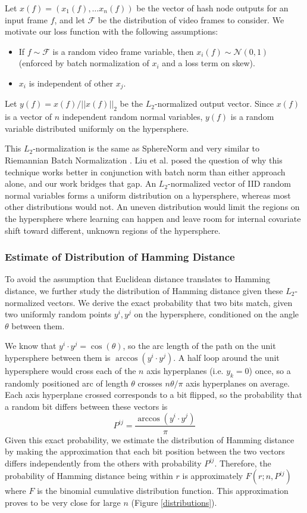 \documentclass{article}
\begin{document}
\begin{multicols}{2}
Let $x(f) = (x_1(f), \ldots x_n(f))$ be the vector of hash node outputs for an input frame $f$, and let $\mathcal{F}$ be the distribution of video frames to consider.
We motivate our loss function with the following assumptions:
\begin{itemize}
\item If $f \sim \mathcal{F}$ is a random video frame variable, then $x_i(f) \sim \mathcal{N}(0,1)$ (enforced by batch normalization of $x_i$ and a loss term on skew).
\item $x_i$ is independent of other $x_j$.
\end{itemize}
Let $y(f) = x(f) / ||x(f)||_2$ be the $L_2$-normalized output vector.
Since $x(f)$ is a vector of $n$ independent random normal variables, $y(f)$ is a random variable distributed uniformly on the hypersphere.

This $L_2$-normalization is the same as SphereNorm \cite{sphere17} and very similar to Riemannian Batch Normalization \cite{riemannian17}.
Liu et al. posed the question of why this technique works better in conjunction with batch norm than either approach alone, and our work bridges that gap.
An $L_2$-normalized vector of IID random normal variables forms a uniform distribution on a hypersphere, whereas most other distributions would not.
An uneven distribution would limit the regions on the hypersphere where learning can happen and leave room for internal covariate shift toward different, unknown regions of the hypersphere.


\subsubsection{Estimate of Distribution of Hamming Distance}

To avoid the assumption that Euclidean distance translates to Hamming distance, we further study the distribution of Hamming distance given these $L_2$-normalized vectors.
We derive the exact probability that two bits match, given two uniformly random points $y^i, y^j$ on the hypersphere, conditioned on the angle $\theta$ between them.

We know that $y^i \cdot y^j = \cos(\theta)$, so the arc length of the path on the unit hypersphere between them is $\arccos(y^i \cdot y^j)$.
A half loop around the unit hypersphere would cross each of the $n$ axis hyperplanes (i.e. $y_k = 0$) once, so a randomly positioned arc of length $\theta$ crosses $n \theta / \pi$ axis hyperplanes on average.
Each axis hyperplane crossed corresponds to a bit flipped, so the probability that a random bit differs between these vectors is
\[P^{ij} = \frac{\arccos\left(y^i \cdot y^j\right)}{\pi}\]
Given this exact probability, we estimate the distribution of Hamming distance by making the approximation that each bit position between the two vectors differs independently from the others with probability $P^{ij}$.
Therefore, the probability of Hamming distance being within $r$ is approximately $F(r; n, P^{ij})$ where $F$ is the binomial cumulative distribution function.
This approximation proves to be very close for large $n$ (Figure \ref{distributions}).


\end{multicols}
\end{document}
